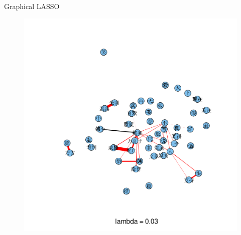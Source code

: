 \documentclass[12pt, trans]{beamer}
\newcommand{\1}[1]{{\mathbf 1}\left\{#1\right\}}        %
\begin{document}
\begin{frame}{Graphical LASSO}

\begin{figure}
  \centering
  \includegraphics[height=0.9\textheight]{./../../gLassoResults/glasso6.png} 
\end{figure}

\end{frame}
\end{document}
